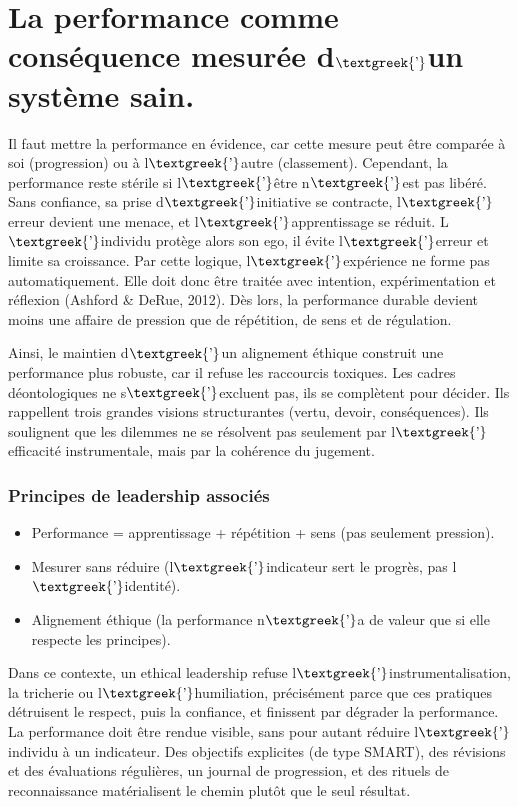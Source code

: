 \documentclass{article}
\begin{document}
\section{La performance comme conséquence mesurée d$\text{\textgreek{’}}$un système sain.}
Il faut mettre la performance en évidence, car cette mesure peut être comparée à soi (progression) ou à
l$\text{\textgreek{’}}$autre (classement). Cependant, la performance reste stérile si l$\text{\textgreek{’}}$être
n$\text{\textgreek{’}}$est pas libéré. Sans confiance, sa prise d$\text{\textgreek{’}}$initiative se contracte,
l$\text{\textgreek{’}}$erreur devient une menace, et l$\text{\textgreek{’}}$apprentissage se réduit.
L$\text{\textgreek{’}}$individu protège alors son ego, il évite l$\text{\textgreek{’}}$erreur et limite sa croissance.
Par cette logique, l$\text{\textgreek{’}}$expérience ne forme pas automatiquement. Elle doit donc être traitée avec
intention, expérimentation et réflexion \label{ref:RND52IQNNKBCF}(Ashford \& DeRue, 2012). Dès lors, la performance
durable devient moins une affaire de pression que de répétition, de sens et de régulation.

Ainsi, le maintien d$\text{\textgreek{’}}$un alignement éthique construit une performance plus robuste, car il refuse
les raccourcis toxiques. Les cadres déontologiques ne s$\text{\textgreek{’}}$excluent pas, ils se complètent pour
décider. Ils rappellent trois grandes visions structurantes (vertu, devoir, conséquences). Ils soulignent que les
dilemmes ne se résolvent pas seulement par l$\text{\textgreek{’}}$efficacité instrumentale, mais par la cohérence du
jugement. 

\subsubsection{Principes de leadership associés}
\begin{itemize}
\item Performance = apprentissage + répétition + sens (pas seulement pression).
\item Mesurer sans réduire (l$\text{\textgreek{’}}$indicateur sert le progrès, pas l$\text{\textgreek{’}}$identité).
\item Alignement éthique (la performance n$\text{\textgreek{’}}$a de valeur que si elle respecte les principes).
\end{itemize}
Dans ce contexte, un ethical leadership refuse l$\text{\textgreek{’}}$instrumentalisation, la tricherie ou
l$\text{\textgreek{’}}$humiliation, précisément parce que ces pratiques détruisent le respect, puis la confiance, et
finissent par dégrader la performance. La performance doit être rendue visible, sans pour autant réduire
l$\text{\textgreek{’}}$individu à un indicateur. Des objectifs explicites (de type SMART), des révisions et des
évaluations régulières, un journal de progression, et des rituels de reconnaissance matérialisent le chemin plutôt que
le seul résultat.
\end{document}
